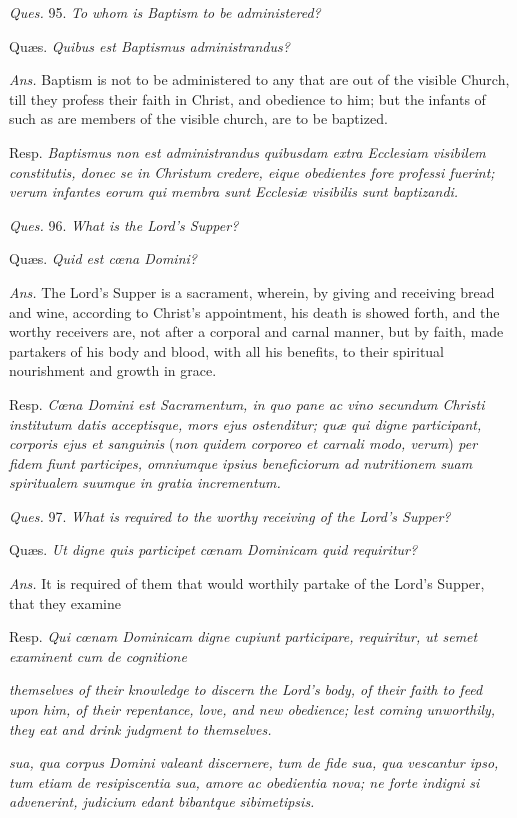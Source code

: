 \emph{Ques.} 95. \emph{To whom is Baptism to be administered?}

Quæs. \emph{Quibus est Baptismus administrandus?}

\emph{Ans.} Baptism is not to be administered to any that are out of the visible Church, till they profess their faith in Christ, and obedience to him; but the infants of such as are members of the visible church, are to be baptized.

Resp. \emph{Baptismus non est administrandus quibusdam extra Ecclesiam visibilem constitutis, donec se in Christum credere, eique obedientes fore professi fuerint; verum infantes eorum qui membra sunt Ecclesiæ visibilis sunt baptizandi.}

\emph{Ques.} 96. \emph{What is the Lord's Supper?}

Quæs. \emph{Quid est cœna Domini?}

\emph{Ans.} The Lord's Supper is a sacrament, wherein, by giving and receiving bread and wine, according to Christ's appointment, his death is showed forth, and the worthy receivers are, not after a corporal and carnal manner, but by faith, made partakers of his body and blood, with all his benefits, to their spiritual nourishment and growth in grace.

Resp. \emph{Cœna Domini est Sacramentum, in quo pane ac vino secundum Christi institutum datis acceptisque, mors ejus ostenditur; quæ qui digne participant, corporis ejus et sanguinis }(\emph{non quidem corporeo et carnali modo, verum}) \emph{per fidem fiunt participes, omniumque ipsius beneficiorum ad nutritionem suam spiritualem suumque in gratia incrementum.}

\emph{Ques.} 97. \emph{What is required to the worthy receiving of the Lord's Supper?}

Quæs. \emph{Ut digne quis participet cœnam Dominicam quid requiritur?}

\emph{Ans.} It is required of them that would worthily partake of the Lord's Supper, that they examine

Resp. \emph{Qui cœnam Dominicam digne cupiunt participare, requiritur, ut semet examinent cum de cognitione }

\emph{themselves of their knowledge to discern the Lord's body, of their faith to feed upon him, of their repentance, love, and new obedience; lest coming unworthily, they eat and drink judgment to themselves.}

\emph{sua, qua corpus Domini valeant discernere, tum de fide sua, qua vescantur ipso, tum etiam de resipiscentia sua, amore ac obedientia nova; ne forte indigni si advenerint, judicium edant bibantque sibimetipsis.}

